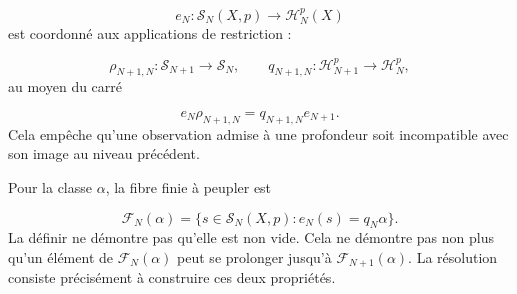 \[
e_N:\mathscr S_N(X,p)\longrightarrow\mathscr H_N^p(X)
\]
est coordonné aux applications de restriction :\par
\[
\rho_{N+1,N}:\mathscr S_{N+1}\longrightarrow\mathscr S_N,
\qquad
q_{N+1,N}:\mathscr H_{N+1}^p\longrightarrow\mathscr H_N^p,
\]
au moyen du carré\par
\[
e_N\rho_{N+1,N}
=
q_{N+1,N}e_{N+1}.
\]
Cela empêche qu’une observation admise à une profondeur soit incompatible avec son image au niveau précédent.\par
Pour la classe \(\alpha\), la fibre finie à peupler est\par
\[
\mathscr F_N(\alpha)
=
\{s\in\mathscr S_N(X,p):e_N(s)=q_N\alpha\}.
\]
La définir ne démontre pas qu’elle est non vide. Cela ne démontre pas non plus qu’un élément de \(\mathscr F_N(\alpha)\) peut se prolonger jusqu’à \(\mathscr F_{N+1}(\alpha)\). La résolution consiste précisément à construire ces deux propriétés.\par
{}

